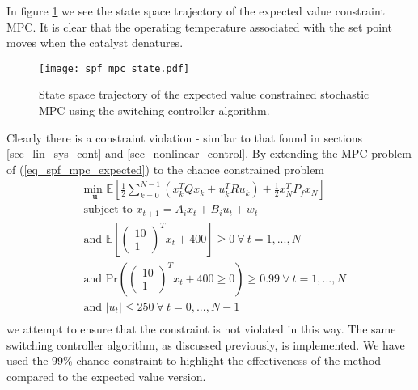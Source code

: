 In figure \ref{fig_spf_mpc_state} we see the state space trajectory of the expected value constraint MPC. It is clear that the operating temperature associated with the set point moves when the catalyst denatures.
\begin{figure}[H] 
\centering
\texttt{[image: spf\_mpc\_state.pdf]}
\caption{State space trajectory of the expected value constrained stochastic MPC using the switching controller algorithm.}
\label{fig_spf_mpc_state}
\end{figure}
Clearly there is a constraint violation - similar to that found in sections \ref{sec_lin_sys_cont} and \ref{sec_nonlinear_control}. By extending the MPC problem of (\ref{eq_spf_mpc_expected}) to the chance constrained problem 
\begin{equation}
\begin{aligned}
&\underset{\mathbf{u}}{\text{min }} \mathbb{E}\left[ \frac{1}{2}\sum_{k=0}^{N-1} \left( x_k^TQx_k + u_k^TRu_k \right) + \frac{1}{2}x_N^TP_fx_N \right] \\
& \text{subject to } x_{t+1}=A_ix_t+B_iu_t + w_t\\
& \text{and } \mathbb{E}[\begin{pmatrix}
10 \\ 1
\end{pmatrix}^Tx_t + 400] \geq 0 ~\forall ~t=1,...,N \\
& \text{and } \text{Pr}(\begin{pmatrix}
10 \\ 1
\end{pmatrix}^T x_t + 400 \geq 0) \geq 0.99 ~\forall ~t=1,...,N\\
& \text{and } |u_t| \leq 250 ~\forall ~t=0,...,N-1\\
\end{aligned}
\label{eq_spf_mpc_chance}
\end{equation} 
we attempt to ensure that the constraint is not violated in this way. The same switching controller algorithm, as discussed previously, is implemented. We have used the 99\% chance constraint to highlight the effectiveness of the method compared to the expected value version. 

